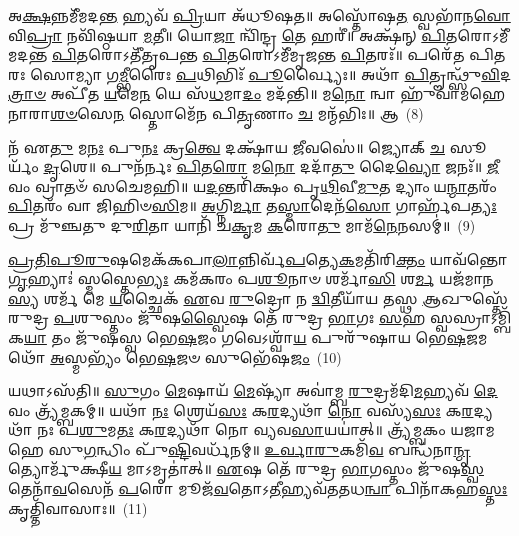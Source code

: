 𑌅\-\ul{𑌕𑍍𑌷}\-𑌨𑍍𑌨𑌮𑍀᳴𑌮𑌦\-\ul{𑌨𑍍𑌤} 𑌹𑍍𑌯𑌵᳴ \ul{𑌪𑍍𑌰𑌿}\-𑌯𑌾 𑌅᳴𑌧𑍂𑌷𑌤॥ 𑌅𑌸𑍍𑌤𑍋᳴𑌷\-\ul{𑌤} 𑌸𑍍𑌵𑌭𑌾᳴𑌨\-\ul{𑌵𑍋} 𑌵𑌿\-\ul{𑌪𑍍𑌰𑌾} 𑌨𑌵𑌿᳴𑌷𑍍𑌠𑌯𑌾 \ul{𑌮}\-𑌤𑍀॥ 𑌯𑍋\-\ul{𑌜𑌾} 𑌨𑍍𑌵𑌿᳴𑌨𑍍𑌦𑍍𑌰 \ul{𑌤𑍇} 𑌹𑌰𑍀॑॥ 𑌅𑌕𑍍𑌷᳴𑌨𑍍 \ul{𑌪𑌿}\-𑌤𑌰𑍋\-𑌽𑌮𑍀᳴𑌮𑌦𑌨𑍍𑌤 \ul{𑌪𑌿}\-𑌤𑌰𑍋\-𑌽𑌤𑍀᳴𑌤𑍃𑌪𑌨𑍍𑌤 \ul{𑌪𑌿}\-𑌤𑌰𑍋\-𑌽𑌮𑍀᳴𑌮𑍃𑌜𑌨𑍍𑌤 \ul{𑌪𑌿}\-𑌤𑌰𑌃᳴॥ 𑌪𑌰𑍇᳴𑌤 𑌪𑌿𑌤𑌰𑌃 𑌸𑍋𑌮𑍍𑌯𑌾 𑌗\-\ul{𑌮𑍍𑌭𑍀}\-𑌰𑍈𑌃 \ul{𑌪}\-𑌥𑌿𑌭𑌿𑌃᳴ \ul{𑌪𑍂}\-𑌰𑍍𑌵𑍍𑌯𑍈𑌃॥ 𑌅𑌥𑌾᳴ \ul{𑌪𑌿}\-𑌤𑍄𑌨𑍍𑌥𑍍𑌸𑍁᳴\-\ul{𑌵𑌿}\-𑌦\-\ul{𑌤𑍍𑌰𑌾}\-\-\ul{𑍞} 𑌅𑌪𑍀᳴𑌤 \ul{𑌯}\-𑌮𑍇\-\ul{𑌨} 𑌯𑍇 𑌸᳴\-\ul{𑌧}\-𑌮𑌾\-\ul{𑌦𑌂} 𑌮𑌦᳴𑌨𑍍𑌤𑌿॥ 𑌮\-\ul{𑌨𑍋} 𑌨𑍍𑌵𑌾 𑌹𑍁᳴𑌵𑌾𑌮𑌹𑍇 𑌨𑌾𑌰𑌾\-\ul{𑌶}\-\-\ul{𑍞}\-𑌸𑍇\-\ul{𑌨} 𑌸𑍍𑌤𑍋𑌮𑍇᳴𑌨 𑌪𑌿\-\ul{𑌤𑍃}\-𑌣𑌾𑌂 \ul{𑌚} 𑌮𑌨𑍍𑌮᳴𑌭𑌿𑌃॥ 𑌆~(8)

𑌨᳴ 𑌏\-\ul{𑌤𑍁} 𑌮\-\ul{𑌨𑌃} 𑌪𑍁\-\ul{𑌨𑌃} 𑌕𑍍𑌰\-\ul{𑌤𑍍𑌵𑍇} 𑌦𑌕𑍍𑌷𑌾᳴𑌯 \ul{𑌜𑍀}\-𑌵𑌸𑍇॑॥ 𑌜𑍍𑌯𑍋𑌕𑍍 \ul{𑌚} 𑌸𑍂𑌰𑍍𑌯𑌂᳴ \ul{𑌦𑍃}\-𑌶𑍇॥ 𑌪𑍁𑌨᳴𑌰𑍍𑌨𑌃 \ul{𑌪𑌿}\-𑌤\-\ul{𑌰𑍋} 𑌮\-\ul{𑌨𑍋} 𑌦𑌦𑌾᳴\-\ul{𑌤𑍁} 𑌦𑍈\-\ul{𑌵𑍍𑌯𑍋} 𑌜𑌨𑌃᳴॥ \ul{𑌜𑍀}\-𑌵𑌂 𑌵𑍍𑌰𑌾𑌤𑍞᳴ 𑌸𑌚𑍇𑌮𑌹𑌿॥ 𑌯\-\ul{𑌦}\-𑌨𑍍𑌤𑌰𑌿᳴𑌕𑍍𑌷𑌂 𑌪𑍃\-\ul{𑌥𑌿}\-𑌵𑍀\-\ul{𑌮𑍁}\-𑌤 𑌦𑍍𑌯𑌾𑌂 𑌯\-\ul{𑌨𑍍𑌮𑌾}\-𑌤𑌰𑌂᳴ \ul{𑌪𑌿}\-𑌤𑌰𑌂᳴ 𑌵𑌾 𑌜𑌿𑌹𑌿𑍞\-\ul{𑌸𑌿}\-𑌮॥ \ul{𑌅}\-𑌗𑍍𑌨𑌿\-\ul{𑌰𑍍𑌮𑌾} 𑌤\-\ul{𑌸𑍍𑌮𑌾}\-𑌦𑍇𑌨᳴\-\ul{𑌸𑍋} 𑌗𑌾𑌰𑍍\mbox{}𑌹᳴𑌪\-\ul{𑌤𑍍𑌯𑌃} 𑌪𑍍𑌰 𑌮𑍁᳴𑌞𑍍𑌚𑌤𑍁 𑌦𑍁\-\ul{𑌰𑌿}\-𑌤𑌾 𑌯𑌾𑌨𑌿᳴ 𑌚\-\ul{𑌕𑍃}\-𑌮 \ul{𑌕}\-𑌰𑍋\-\ul{𑌤𑍁} 𑌮𑌾𑌮᳴\-\ul{𑌨𑍇}\-𑌨𑌸𑌮𑍍॑॥~(9)

{\anuvakamend[{𑌹\-\ul{𑌰𑍀} 𑌮𑌨𑍍𑌮᳴\-\ul{𑌭𑌿}\-𑌰𑌾 𑌚𑌤𑍁᳴𑌶𑍍𑌚𑌤𑍍𑌵𑌾𑌰𑌿𑍞𑌶𑌚𑍍𑌚}]}%

\-\ul{𑌪𑍍𑌰}\-\-\ul{𑌤𑌿}\-\-\ul{𑌪𑍂}\-\-\ul{𑌰𑍁}\-𑌷𑌮𑍇𑌕᳴𑌕𑌪𑌾\-\ul{𑌲𑌾}\-𑌨𑍍𑌨𑌿𑌰𑍍𑌵᳴\-\ul{𑌪}\-𑌤𑍍𑌯𑍇\-\ul{𑌕}\-𑌮𑌤𑌿᳴𑌰𑌿\-\ul{𑌕𑍍𑌤𑌂} 𑌯𑌾𑌵᳴𑌨𑍍𑌤𑍋 \ul{𑌗𑍃}\-𑌹𑍍𑌯𑌾𑌃॑ 𑌸𑍍𑌮𑌸𑍍𑌤𑍇\-\ul{𑌭𑍍𑌯𑌃} 𑌕𑌮᳴𑌕𑌰𑌂 𑌪\-\ul{𑌶𑍂}\-𑌨𑌾𑍞 𑌶𑌰𑍍𑌮𑌾᳴\-\ul{𑌸𑌿} 𑌶\-\ul{𑌰𑍍𑌮} 𑌯𑌜᳴𑌮𑌾𑌨\-\ul{𑌸𑍍𑌯} 𑌶𑌰𑍍𑌮᳴ 𑌮𑍇 \ul{𑌯}\-𑌚𑍍𑌛𑍈𑌕᳴ \ul{𑌏}\-𑌵 \ul{𑌰𑍁}\-𑌦𑍍𑌰𑍋 𑌨 \ul{𑌦𑍍𑌵𑌿}\-𑌤𑍀𑌯𑌾᳴𑌯 𑌤𑌸𑍍𑌥 \ul{𑌆}\-𑌖𑍁𑌸𑍍𑌤𑍇᳴ 𑌰𑍁𑌦𑍍𑌰 \ul{𑌪}\-𑌶𑍁𑌸𑍍𑌤𑌂 𑌜𑍁᳴𑌷\-\ul{𑌸𑍍𑌵𑍈}\-𑌷 𑌤𑍇᳴ 𑌰𑍁𑌦𑍍𑌰 \ul{𑌭𑌾}\-𑌗𑌃 \ul{𑌸}\-𑌹 𑌸𑍍𑌵𑌸𑍍𑌰𑌾\-𑌽𑌮𑍍𑌬𑌿᳴𑌕\-\ul{𑌯𑌾} 𑌤𑌂 𑌜𑍁᳴𑌷𑌸𑍍𑌵 𑌭𑍇\-\ul{𑌷}\-𑌜𑌂 𑌗𑌵𑍇\-𑌽𑌶𑍍𑌵𑌾᳴\-\ul{𑌯} 𑌪𑍁𑌰𑍁᳴𑌷𑌾𑌯 𑌭𑍇\-\ul{𑌷}\-𑌜𑌮𑌥𑍋᳴ \ul{𑌅}\-𑌸𑍍𑌮𑌭𑍍𑌯𑌂᳴ 𑌭𑍇\-\ul{𑌷}\-𑌜𑍞 𑌸𑍁𑌭𑍇᳴𑌷\-\ul{𑌜𑌂}\-~(10)

𑌯𑌥𑌾\-𑌽𑌸᳴𑌤𑌿॥ \ul{𑌸𑍁}\-𑌗𑌂 \ul{𑌮𑍇}\-𑌷𑌾𑌯᳴ \ul{𑌮𑍇}\-𑌷𑍍𑌯𑌾᳴ 𑌅𑌵𑌾॑𑌮𑍍𑌬 \ul{𑌰𑍁}\-𑌦𑍍𑌰𑌮᳴𑌦𑌿\-\ul{𑌮}\-𑌹𑍍𑌯𑌵᳴ \ul{𑌦𑍇}\-𑌵𑌂 𑌤𑍍𑌰𑍍𑌯᳴𑌮𑍍𑌬𑌕𑌮𑍍॥ 𑌯𑌥𑌾᳴ \ul{𑌨𑌃} 𑌶𑍍𑌰𑍇𑌯᳴\-\ul{𑌸𑌃} 𑌕\-\ul{𑌰}\-𑌦𑍍𑌯𑌥𑌾᳴ \ul{𑌨𑍋} 𑌵𑌸𑍍𑌯᳴\-\ul{𑌸𑌃} 𑌕\-\ul{𑌰}\-𑌦𑍍𑌯𑌥𑌾᳴ 𑌨𑌃 𑌪\-\ul{𑌶𑍁}\-𑌮\-\ul{𑌤𑌃} 𑌕\-\ul{𑌰}\-𑌦𑍍𑌯𑌥𑌾᳴ 𑌨𑍋 𑌵𑍍𑌯𑌵\-\ul{𑌸𑌾}\-𑌯𑌯𑌾॑𑌤𑍍॥ 𑌤𑍍𑌰𑍍𑌯᳴𑌮𑍍𑌬𑌕𑌂 𑌯𑌜𑌾𑌮𑌹𑍇 𑌸𑍁\-\ul{𑌗}\-𑌨𑍍𑌧𑌿𑌂 𑌪𑍁᳴\-\ul{𑌷𑍍𑌟𑌿}\-𑌵𑌰𑍍𑌧᳴𑌨𑌮𑍍॥ \ul{𑌉}\-\-\ul{𑌰𑍍𑌵𑌾}\-\-\ul{𑌰𑍁}\-𑌕𑌮𑌿᳴\-\ul{𑌵} 𑌬𑌨𑍍𑌧᳴𑌨𑌾\-\ul{𑌨𑍍𑌮𑍃}\-𑌤𑍍𑌯𑍋𑌰𑍍𑌮𑍁᳴𑌕𑍍𑌷𑍀\-\ul{𑌯} 𑌮𑌾\-𑌽𑌮𑍃𑌤𑌾॑𑌤𑍍॥ \ul{𑌏}\-𑌷 𑌤𑍇᳴ 𑌰𑍁𑌦𑍍𑌰 \ul{𑌭𑌾}\-𑌗𑌸𑍍𑌤𑌂 𑌜𑍁᳴𑌷\-\ul{𑌸𑍍𑌵} 𑌤𑍇𑌨𑌾᳴\-\ul{𑌵}\-𑌸𑍇𑌨᳴ \ul{𑌪}\-𑌰𑍋 𑌮𑍂𑌜᳴\-\ul{𑌵}\-𑌤𑍋\-𑌽\-\ul{𑌤𑍀}\-𑌹𑍍𑌯𑌵᳴𑌤𑌤𑌧\-\ul{𑌨𑍍𑌵𑌾} 𑌪𑌿𑌨𑌾᳴𑌕𑌹\-\ul{𑌸𑍍𑌤𑌃} 𑌕𑍃𑌤𑍍𑌤𑌿᳴𑌵𑌾𑌸𑌾𑌃॥~(11)

{\anuvakamend[{𑌸𑍁𑌭𑍇᳴𑌷𑌜𑌮𑌿\-\ul{𑌹𑌿} 𑌤𑍍𑌰𑍀𑌣𑌿᳴ 𑌚}]}%

